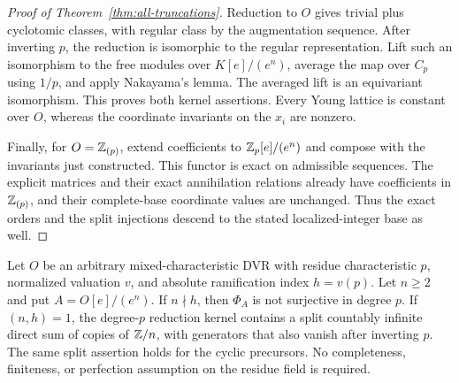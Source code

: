\begin{proof}[Proof of Theorem~\ref{thm:all-truncations}]
Reduction to $O$ gives trivial plus cyclotomic classes, with regular
class by the augmentation sequence.  After inverting $p$, the reduction is isomorphic to the regular
representation.  Lift such an isomorphism to the free modules over
$K[e]/(e^n)$, average the map over $C_p$ using $1/p$, and apply
Nakayama's lemma.  The averaged lift is an equivariant isomorphism.
This proves both kernel assertions.
Every Young lattice is constant over $O$, whereas the coordinate
invariants on the $x_i$ are nonzero.

Finally, for $O=\mathbb Z_{(p)}$, extend coefficients to
$\mathbb Z_p[e]/(e^n)$ and compose with the invariants just constructed.
This functor is exact on admissible sequences.  The explicit matrices
and their exact annihilation relations already have coefficients in
$\mathbb Z_{(p)}$, and their complete-base coordinate values are unchanged.
Thus the exact orders and the split injections descend to the stated
localized-integer base as well.
\end{proof}

\begin{corollary}\label{cor:ramified-all-truncations}
Let $O$ be an arbitrary mixed-characteristic DVR with residue
characteristic $p$, normalized valuation $v$, and absolute
ramification index $h=v(p)$.  Let $n\ge2$ and put
$A=O[e]/(e^n)$.
If $n\nmid h$, then $\Phi_A$ is not surjective in degree $p$.
If $(n,h)=1$, the degree-$p$ reduction kernel contains a split
countably infinite direct sum of copies of $\mathbb Z/n$, with generators
that also vanish after inverting $p$.
The same split assertion holds for the cyclic precursors.
No completeness, finiteness, or perfection assumption on the
residue field is required.
\end{corollary}

